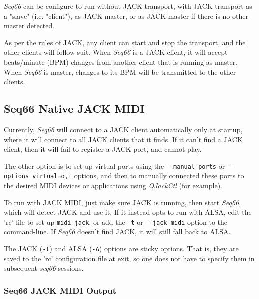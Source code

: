 
   \textsl{Seq66} can be configure to run without JACK transport, with JACK
   transport as a "slave" (i.e. "client"), as JACK master, or as JACK master if
   there is no other master detected.

   As per the rules of JACK, any client can start and stop the transport, and
   the other clients will follow suit.  When \textsl{Seq66} is a JACK client,
   it will accept beats/minute (BPM) changes from another client that is
   running as master.  When \textsl{Seq66} is master, changes to its BPM will
   be transmitted to the other clients.

\subsection{Seq66 Native JACK MIDI}
\label{subsec:jack_native_midi}

   Currently, \textsl{Seq66} will connect to a JACK
   client automatically only at startup, where it will connect to all JACK
   clients that it finds.  If it can't find a JACK client, then it will
   fail to register a JACK port, and cannot play.

   The other option is to set up virtual ports using the
   \texttt{-{}-manual-ports} or \texttt{-{}-options virtual=o,i} options, and then
   to manually connected these ports to the desired MIDI devices or
   applications using \textsl{QJackCtl} (for example).

   To run with JACK MIDI, just make sure JACK is running, then start
   \textsl{Seq66}, which will detect JACK and use it.
   If it instead opts to run with ALSA, edit the 'rc' file to set up
   \texttt{midi\_jack}, or add the
   \texttt{-t} or \texttt{-{}-jack-midi}
   option to the command-line.
   If \textsl{Seq66} doesn't find JACK, it will still fall back to ALSA.

   The JACK (\texttt{-t}) and ALSA (\texttt{-A}) options are sticky options.
   That is, they are saved to the 'rc' configuration file at exit,
   so one does not have to specify them in subsequent \textsl{seq66} sessions.

\subsubsection{Seq66 JACK MIDI Output}
\label{subsubsec:jack_midi_output}

